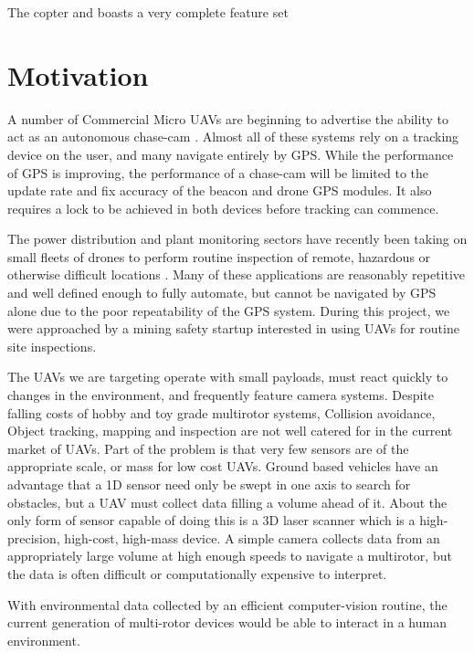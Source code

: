 \documentclass{article}
\begin{document}
    The copter and boasts a very complete feature set 





  \section{Motivation}

    A number of Commercial Micro UAVs are beginning to advertise the ability to act as an autonomous chase-cam \cite{Lily} \cite{AirDog}.  Almost all of these systems rely on a tracking device on the user, and many navigate entirely by GPS.  While the performance of GPS is improving, the performance of a chase-cam will be limited to the update rate and fix accuracy of the beacon and drone GPS modules.  It also requires a lock to be achieved in both devices before tracking can commence.

    The power distribution and plant monitoring sectors have recently been taking on small fleets of drones to perform routine inspection of remote, hazardous or otherwise difficult locations \cite{RopeAccess}.  Many of these applications are reasonably repetitive and well defined enough to fully automate, but cannot be navigated by GPS alone due to the poor repeatability of the GPS system.
    During this project, we were approached by a mining safety startup interested in using UAVs for routine site inspections.

    The UAVs we are targeting operate with small payloads, must react quickly to changes in the environment, and frequently feature camera systems.
    Despite falling costs of hobby and toy grade multirotor systems, Collision avoidance, Object tracking,   mapping and inspection are not well catered for in the current market of UAVs.
    Part of the problem is that very few sensors are of the appropriate scale, or mass for low cost UAVs.
    Ground based vehicles have an advantage that a 1D sensor need only be swept in one axis to search for obstacles, but a UAV must collect data filling a volume ahead of it. About the only form of sensor capable of doing this is a 3D laser scanner which is a high-precision, high-cost, high-mass device.
    A simple camera collects data from an appropriately large volume at high enough speeds to navigate a multirotor, but the data is often difficult or computationally expensive to interpret.

    With environmental data collected by an efficient computer-vision routine, the current generation of multi-rotor devices would be able to interact in a human environment.
\end{document}
